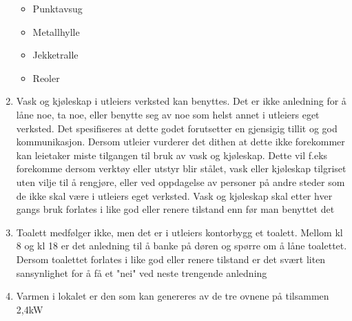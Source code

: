 \begin{enumerate}
\begin{itemize}
				\item Punktavsug

				\item Metallhylle

				\item Jekketralle

				\item Reoler

			\end{itemize}

		\item Vask og kjøleskap i utleiers verksted kan benyttes. Det er ikke anledning for å låne noe, ta noe, eller benytte seg av noe som helst annet i utleiers eget verksted. Det spesifiseres at dette godet forutsetter en gjensigig tillit og god kommunikasjon. Dersom utleier vurderer det dithen at dette ikke forekommer kan leietaker miste tilgangen til bruk av vask og kjøleskap. Dette vil f.eks forekomme dersom verktøy eller utstyr blir stålet, vask eller kjøleskap tilgriset uten vilje til å rengjøre, eller ved oppdagelse av personer på andre steder som de ikke skal være i utleiers eget verksted. Vask og kjøleskap skal etter hver gangs bruk forlates i like god eller renere tilstand enn før man benyttet det

		\item Toalett medfølger ikke, men det er i utleiers kontorbygg et toalett. Mellom kl 8 og kl 18 er det anledning til å banke på døren og spørre om å låne toalettet. Dersom toalettet forlates i like god eller renere tilstand er det svært liten sansynlighet for å få et "nei" ved neste trengende anledning

		\item Varmen i lokalet er den som kan genereres av de tre ovnene på tilsammen 2,4kW

	\end{enumerate}

